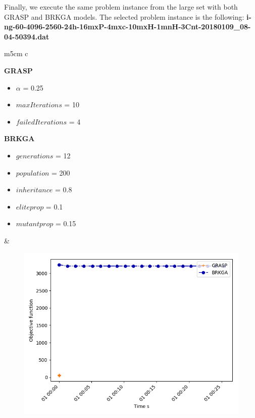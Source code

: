 Finally, we execute the same problem instance from the large set with both GRASP and BRKGA models. The selected problem instance is the following: \textbf{i-ng-60-4096-2560-24h-16mxP-4mxc-10mxH-1mnH-3Cnt-20180109\_08-04-50394.dat }


\begin{table}[h!]
  \centering
  \begin{tabular}{ m{5cm}  c   }

  	\textbf{GRASP}
	\begin{itemize}
		\item $\alpha$ = 0.25
		\item $maxIterations$ = 10
		\item $failedIterations$ = 4
	\end{itemize}

	\textbf{BRKGA}
	\begin{itemize}
		\item $generations$ = 12
		\item $population$ = 200
		\item $inheritance$ = 0.8 
		\item $eliteprop$ = 0.1
		\item $mutantprop$ = 0.15
	\end{itemize}


	&

  	\begin{minipage}{\textwidth}
	\begin{subfigure}[b]{.8\linewidth}
	\includegraphics[width=0.8\linewidth]{./img/metah_comparison_objfunc.png}
	\end{subfigure}
	\end{minipage}


	 \\

  \end{tabular}
  \label{meta_comparison}
\end{table}


